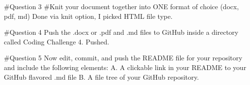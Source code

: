 \documentclass[
]{article}
\begin{document}
\#Question 3 \#Knit your document together into ONE format of choice
(docx, pdf, md) Done via knit option, I picked HTML file type.

\#Question 4 Push the .docx or .pdf and .md files to GitHub inside a
directory called Coding Challenge 4. Pushed.

\#Question 5 Now edit, commit, and push the README file for your
repository and include the following elements: A. A clickable link in
your README to your GitHub flavored .md file B. A file tree of your
GitHub repository.
\end{document}
